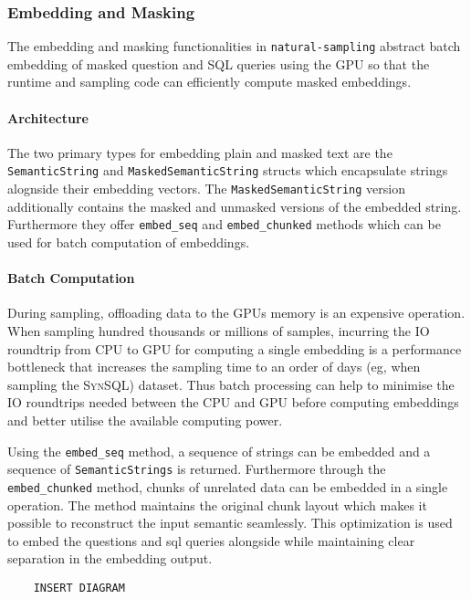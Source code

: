 \subsubsection{Embedding and Masking}

The embedding and masking functionalities in \texttt{natural-sampling} abstract
batch embedding of masked question and SQL queries using the GPU so that the
runtime and sampling code can efficiently compute masked embeddings.

\paragraph{Architecture}

The two primary types for embedding plain and masked text are the
\texttt{SemanticString} and \texttt{MaskedSemanticString} structs which
encapsulate strings alognside their embedding vectors. The
\texttt{MaskedSemanticString} version additionally contains the masked and
unmasked versions of the embedded string. Furthermore they offer
\texttt{embed\_seq} and \texttt{embed\_chunked} methods which can be used for
batch computation of embeddings.

\paragraph{Batch Computation}

During sampling, offloading data to the GPUs memory is an expensive operation.
When sampling hundred thousands or millions of samples, incurring the IO
roundtrip from CPU to GPU for computing a single embedding is a
performance bottleneck that increases the sampling time to an order of days
(eg, when sampling the \textsc{SynSQL}) dataset. Thus batch processing can help to
minimise the IO roundtrips needed between the CPU and GPU before computing
embeddings and better utilise the available computing power.

Using the \texttt{embed\_seq} method, a sequence of strings can be embedded and
a sequence of \texttt{SemanticStrings} is returned. Furthermore through the
\texttt{embed\_chunked} method, chunks of unrelated data can be embedded in a
single operation. The method maintains the original chunk layout which makes it
possible to reconstruct the input semantic seamlessly. This optimization is
used to embed the questions and sql queries alongside while maintaining clear
separation in the embedding output.

\begin{verbatim}
    INSERT DIAGRAM
\end{verbatim}

